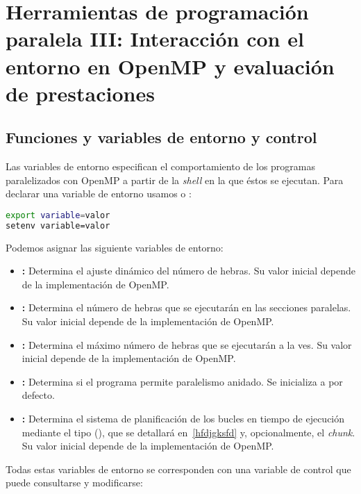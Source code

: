 \chapter{Herramientas de programación paralela III\@: Interacción con el entorno en OpenMP y evaluación de prestaciones}

\section{Funciones y variables de entorno y control}

Las variables de entorno especifican el comportamiento de los programas paralelizados con OpenMP a partir de la \textit{shell} en la que éstos se ejecutan.
Para declarar una variable de entorno usamos  o :

\begin{lstlisting}[language=sh]
export variable=valor
setenv variable=valor
\end{lstlisting}

Podemos asignar las siguiente variables de entorno:

\begin{itemize}
	\item{}\textbf{:} Determina el ajuste dinámico del número de hebras. Su valor inicial depende de la implementación de OpenMP\@.
	\item{}\textbf{:} Determina el número de hebras que se ejecutarán en las secciones paralelas. Su valor inicial depende de la implementación de OpenMP\@.
	\item{}\textbf{:} Determina el máximo número de hebras que se ejecutarán a la ves. Su valor inicial depende de la implementación de OpenMP\@.
	\item{}\textbf{:} Determina si el programa permite paralelismo anidado. Se inicializa a  por defecto.
	\item{}\textbf{:} Determina el sistema de planificación de los bucles en tiempo de ejecución mediante el tipo (), que se detallará en~\ref{hfdjgksfd} y, opcionalmente, el \textit{chunk}. Su valor inicial depende de la implementación de OpenMP\@.
\end{itemize}

Todas estas variables de entorno se corresponden con una variable de control que puede consultarse y modificarse:

